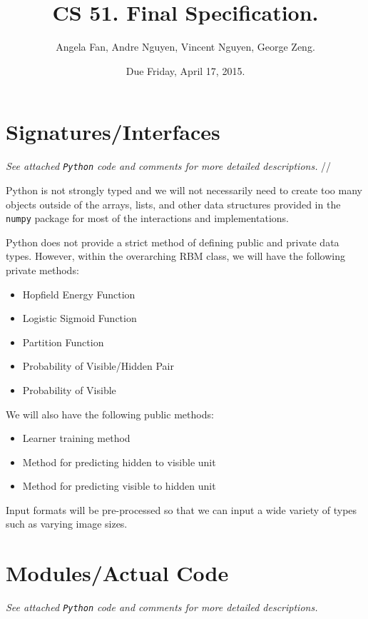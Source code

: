 \documentclass[12pt]{article}
\begin{document}
\title{CS 51. Final Specification.}
\date{Due Friday, April 17, 2015.}
\author{Angela Fan, Andre Nguyen, Vincent Nguyen, George Zeng.} 
\maketitle

\section{Signatures/Interfaces}
\textit{See attached \texttt{Python} code and comments for more detailed descriptions.} //

Python is not strongly typed and we will not necessarily need to create too many objects outside of the arrays, lists, and other data structures provided in the \texttt{numpy} package for most of the interactions and implementations.

Python does not provide a strict method of defining public and private data types. However, within the overarching RBM class, we will have the following private methods:
\begin{itemize}
  \item Hopfield Energy Function
  \item Logistic Sigmoid Function
  \item Partition Function
  \item Probability of Visible/Hidden Pair
  \item Probability of Visible
\end{itemize}

We will also have the following public methods:
\begin{itemize}
  \item Learner training method
  \item Method for predicting hidden to visible unit
  \item Method for predicting visible to hidden unit
\end{itemize}

Input formats will be pre-processed so that we can input a wide variety of types such as varying image sizes.

\section{Modules/Actual Code}
\textit{See attached \texttt{Python} code and comments for more detailed descriptions.} \\
\end{document}

